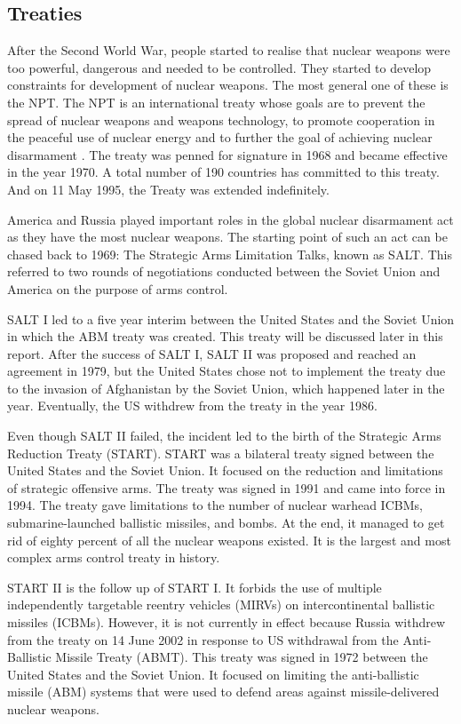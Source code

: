 \documentclass[twoside,titlepage,11pt,twocolumn,a4paper]{article}
\begin{document}
\subsection{Treaties}
After the Second World War, people started to realise that nuclear
weapons were too powerful, dangerous and needed to be controlled. They
started to develop constraints for development of nuclear weapons.  The
most general one of these is the NPT. \citep{unoda} The NPT is an
international treaty whose goals are to prevent the spread of nuclear
weapons and weapons technology, to promote cooperation in the peaceful
use of nuclear energy and to further the goal of achieving nuclear
disarmament .  The treaty was penned for signature in 1968 and became 
effective in the year 1970. A total number of 190 countries has 
committed to this treaty. And on 11 May 1995, the Treaty was extended
indefinitely.

America and Russia played important roles in the global nuclear
disarmament act as they have the most nuclear weapons. The starting
point of such an act can be chased back to 1969: The Strategic Arms
Limitation Talks, known as SALT. \citep{burr2001} This referred to 
two rounds of negotiations conducted between the Soviet Union and America 
on the purpose of arms control.

SALT I led to a five year interim between the United States and the Soviet
Union in which the ABM treaty was created. This treaty will be discussed later in this
report. After the success of SALT I, SALT II was proposed and reached
an agreement in 1979, but the United States chose not to implement
the treaty due to the invasion of Afghanistan by the Soviet Union,
which happened later in the year. Eventually, the US withdrew from the
treaty in the year 1986.

Even though SALT II failed, the incident led to the birth of the
Strategic Arms Reduction Treaty (START). \citep{startI} START was a 
bilateral treaty signed between the United States and the Soviet Union. It 
focused on the reduction and limitations of strategic offensive arms. The 
treaty was signed in 1991 and came into force in 1994. The treaty gave
limitations to the number of nuclear warhead ICBMs, submarine-launched 
ballistic missiles, and bombs. At the end, it managed to get rid of 
eighty percent of all the nuclear weapons existed. It is the largest 
and most complex arms control treaty in history. 

START II is the follow up of START I. It forbids the use of multiple
independently targetable reentry vehicles (MIRVs) on intercontinental 
ballistic missiles (ICBMs). \citep{startII} However, it is not currently
in effect because Russia withdrew from the treaty 
on 14 June 2002 in response to US withdrawal from the 
Anti-Ballistic Missile Treaty (ABMT). This treaty was signed in 1972 
between the United States and the Soviet Union. It focused on limiting 
the anti-ballistic missile (ABM) systems that were used to defend areas 
against missile-delivered nuclear weapons. \citep{burr2001}
\end{document}
